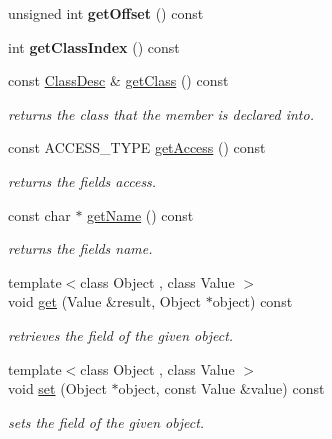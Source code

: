 \begin{DoxyCompactItemize}
\item 
unsigned int {\bfseries get\+Offset} () const \hypertarget{classagm_1_1reflection_1_1_field_desc_a7c9c6bbb3dad3653d631c6124aea9718}{}\label{classagm_1_1reflection_1_1_field_desc_a7c9c6bbb3dad3653d631c6124aea9718}

\item 
int {\bfseries get\+Class\+Index} () const \hypertarget{classagm_1_1reflection_1_1_field_desc_a494c92e10506c69ad97f7118ca5e9864}{}\label{classagm_1_1reflection_1_1_field_desc_a494c92e10506c69ad97f7118ca5e9864}

\item 
const \hyperlink{classagm_1_1reflection_1_1_class_desc}{Class\+Desc} \& \hyperlink{classagm_1_1reflection_1_1_field_desc_a103ea498457f9ae4bed81e7b17f3b0a3}{get\+Class} () const 
\begin{DoxyCompactList}\small\item\em returns the class that the member is declared into. \end{DoxyCompactList}\item 
const A\+C\+C\+E\+S\+S\+\_\+\+T\+Y\+PE \hyperlink{classagm_1_1reflection_1_1_field_desc_a66684de39de57a1ec9bf106df649adbf}{get\+Access} () const 
\begin{DoxyCompactList}\small\item\em returns the field\textquotesingle{}s access. \end{DoxyCompactList}\item 
const char $\ast$ \hyperlink{classagm_1_1reflection_1_1_field_desc_a99890532c8e3e88043256272d04ec533}{get\+Name} () const 
\begin{DoxyCompactList}\small\item\em returns the field\textquotesingle{}s name. \end{DoxyCompactList}\item 
{\footnotesize template$<$class Object , class Value $>$ }\\void \hyperlink{classagm_1_1reflection_1_1_field_desc_a82e89e0ecceb1ceaaff712ac08685927}{get} (Value \&result, Object $\ast$object) const 
\begin{DoxyCompactList}\small\item\em retrieves the field of the given object. \end{DoxyCompactList}\item 
{\footnotesize template$<$class Object , class Value $>$ }\\void \hyperlink{classagm_1_1reflection_1_1_field_desc_a6fc0d156c0617a40d40a5eef2644c23b}{set} (Object $\ast$object, const Value \&value) const 
\begin{DoxyCompactList}\small\item\em sets the field of the given object. \end{DoxyCompactList}\end{DoxyCompactItemize}
